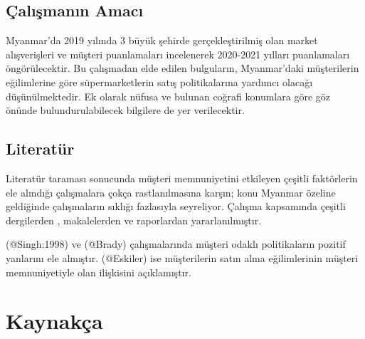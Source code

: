 \documentclass[
]{article}
\newlength{\cslhangindent}
\newlength{\cslentryspacingunit} %
\newenvironment{CSLReferences}[2] %
 {%
  \setlength{\parindent}{0pt}
  \ifodd #1
  \let\oldpar\par
  \def\par{\hangindent=\cslhangindent\oldpar}
  \fi
  \setlength{\parskip}{#2\cslentryspacingunit}
 }%
 {}
\begin{document}
\hypertarget{uxe7alux131ux15fmanux131n-amacux131}{%
\subsection{Çalışmanın
Amacı}\label{uxe7alux131ux15fmanux131n-amacux131}}

Myanmar'da 2019 yılında 3 büyük şehirde gerçekleştirilmiş olan market
alışverişleri ve müşteri puanlamaları incelenerek 2020-2021 yılları
puanlamaları öngörülecektir. Bu çalışmadan elde edilen bulguların,
Myanmar'daki müşterilerin eğilimlerine göre süpermarketlerin satış
politikalarına yardımcı olacağı düşünülmektedir. Ek olarak nüfusa ve
bulunan coğrafi konumlara göre göz önünde bulundurulabilecek bilgilere
de yer verilecektir.

\hypertarget{literatuxfcr}{%
\subsection{Literatür}\label{literatuxfcr}}

Literatür taraması sonucunda müşteri memnuniyetini etkileyen çeşitli
faktörlerin ele alındığı çalışmalara çokça rastlanılmasına karşın; konu
Myanmar özeline geldiğinde çalışmaların sıklığı fazlasıyla seyreliyor.
Çalışma kapsamında çeşitli dergilerden , makalelerden ve raporlardan
yararlanılmıştır.

(@Singh:1998) ve (@Brady) çalışmalarında müşteri odaklı politikaların
pozitif yanlarını ele almıştır. (@Eskiler) ise müşterilerin satın alma
eğilimlerinin müşteri memnuniyetiyle olan ilişkisini açıklamıştır.

\newpage

\hypertarget{references}{%
\section{Kaynakça}\label{references}}

\hypertarget{refs}{}
\begin{CSLReferences}{0}{0}
\end{CSLReferences}
\end{document}
